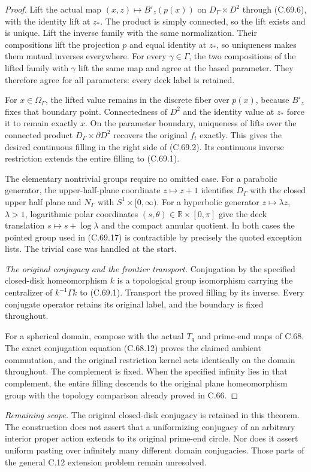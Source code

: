 \begin{proof}
Lift the actual map
$(x,z)\mapsto B'_z(p(x))$
on $D_\Gamma\times D^2$
through (C.69.6), with the
identity lift at $z_*$.
The product is simply
connected, so the lift
exists and is unique.
Lift the inverse family
with the same normalization.
Their compositions lift
the projection $p$ and
equal identity at $z_*$,
so uniqueness makes them
mutual inverses everywhere.
For every $\gamma\in\Gamma$,
the two compositions of
the lifted family with
$\gamma$ lift the same
map and agree at the
based parameter. They
therefore agree for all
parameters: every deck
label is retained.

For $x\in\Omega_\Gamma$,
the lifted value remains
in the discrete fiber over
$p(x)$, because $B'_z$
fixes that boundary point.
Connectedness of $D^2$
and the identity value
at $z_*$ force it to
remain exactly $x$.
On the parameter boundary,
uniqueness of lifts over
the connected product
$D_\Gamma\times\partial D^2$
recovers the original
$f_t$ exactly.
This gives the desired
continuous filling in
the right side of (C.69.2).
Its continuous inverse
restriction extends the
entire filling to (C.69.1).

The elementary nontrivial
groups require no omitted
case. For a parabolic
generator, the upper-half-plane
coordinate $z\mapsto z+1$
identifies $D_\Gamma$ with
the closed upper half plane
and $N_\Gamma$ with
$S^1\times[0,\infty)$.
For a hyperbolic generator
$z\mapsto\lambda z$,
$\lambda>1$, logarithmic
polar coordinates
$(s,\theta)\in\mathbb R\times[0,\pi]$
give the deck translation
$s\mapsto s+\log\lambda$
and the compact annular
quotient. In both cases
the pointed group used in
(C.69.17) is contractible
by precisely the quoted
exception lists.
The trivial case was
handled at the start.

\emph{The original conjugacy and the frontier transport.}
Conjugation by the specified
closed-disk homeomorphism
$k$ is a topological group
isomorphism carrying the
centralizer of $k^{-1}\Gamma k$
to (C.69.1).
Transport the proved filling
by its inverse. Every
conjugate operator retains
its original label, and
the boundary is fixed
throughout.

For a spherical domain,
compose with the actual
$T_q$ and prime-end maps
of C.68. The exact
conjugation equation
(C.68.12) proves the
claimed ambient commutation,
and the original restriction
kernel acts identically
on the domain throughout.
The complement is fixed.
When the specified infinity
lies in that complement,
the entire filling descends
to the original plane
homeomorphism group with
the topology comparison
already proved in C.66.
\end{proof}

\emph{Remaining scope.}
The original closed-disk
conjugacy is retained in
this theorem. The construction
does not assert that a
uniformizing conjugacy of
an arbitrary interior proper
action extends to its
original prime-end circle.
Nor does it assert uniform
pasting over infinitely many
different domain conjugacies.
Those parts of the general
C.12 extension problem
remain unresolved.
